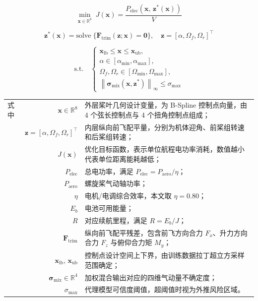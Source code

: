 \begin{equation}
  \min_{\mathbf{x}\in\mathbb{R}^8}\; J(\mathbf{x}) = \frac{P_\text{elec}(\mathbf{x},\,\mathbf{z}^*(\mathbf{x}))}{V}
  \label{eq:opt_obj}
\end{equation}

\begin{equation}
  \mathbf{z}^*(\mathbf{x}) = \text{solve}\;\bigl\{\mathbf{F}_{\mathrm{trim}}(\mathbf{z};\mathbf{x})=\mathbf{0}\bigr\},\quad
  \mathbf{z}=[\alpha,\Omega_f,\Omega_r]^\top
  \label{eq:opt_inner}
\end{equation}

\begin{equation}
  \text{s.t.}\quad
  \left\{
  \begin{aligned}
  \mathbf{x}_\text{lb} \leq \mathbf{x} \leq \mathbf{x}_\text{ub}, \\[3pt]
  \alpha\in[\alpha_\text{min},\alpha_\text{max}], \\[3pt]
  \Omega_f,\Omega_r\in[\Omega_\text{min},\Omega_\text{max}], \\[3pt]
  \left\|\bm{\sigma}_{\mathrm{mix}}(\mathbf{x},\mathbf{z}^*)\right\|_\infty \leq \sigma_\text{max}
  \end{aligned}
  \right.
  \label{eq:opt_constraints}
\end{equation}

\noindent
\begin{tabularx}{\textwidth}{@{}l@{\quad}r@{———}X@{}}
式中 & $\mathbf{x}\in\mathbb{R}^{8}$ & 外层桨叶几何设计变量，为 B-Spline 控制点向量，由 4 个弦长控制点与 4 个扭角控制点组成；\\
     & $\mathbf{z}=[\alpha,\Omega_f,\Omega_r]^\top$ & 内层纵向前飞配平量，分别为机体迎角、前桨组转速和后桨组转速；\\
     & $J(\mathbf{x})$ & 优化目标函数，表示单位航程电功率消耗，数值越小代表单位距离能耗越低；\\
     & $P_\text{elec}$ & 总电功率，满足 $P_\text{elec}=P_\text{aero}/\eta$；\\
     & $P_\text{aero}$ & 螺旋桨气动轴功率；\\
     & $\eta$ & 电机/电调综合效率，本文取 $\eta=0.80$；\\
     & $E_b$ & 电池可用能量；\\
     & $R$ & 对应续航里程，满足 $R=E_b/J$；\\
     & $\mathbf{F}_{\mathrm{trim}}$ & 纵向前飞配平残差，包含前飞方向合力 $F_x$、升力方向合力 $F_z$ 与俯仰合力矩 $M_y$；\\
     & $\mathbf{x}_\text{lb},\,\mathbf{x}_\text{ub}$ & 控制点设计空间上下界，由训练数据拉丁超立方采样范围确定；\\
     & $\bm{\sigma}_{\mathrm{mix}}\in\mathbb{R}^{4}$ & 加权混合输出对应的四维气动量不确定度；\\
     & $\sigma_\text{max}$ & 代理模型可信度阈值，超阈值时视为外推风险区域。\\
\end{tabularx}\vspace{3.15bp}

